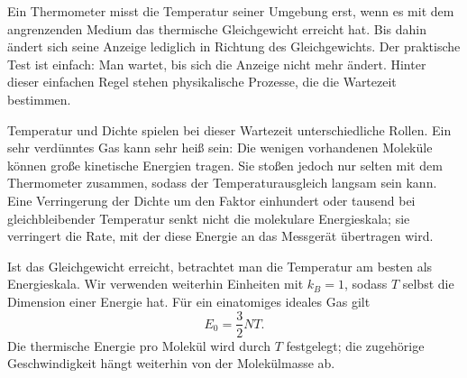 Ein Thermometer misst die Temperatur seiner Umgebung erst, wenn es mit dem angrenzenden Medium das thermische Gleichgewicht erreicht hat. Bis dahin ändert sich seine Anzeige lediglich in Richtung des Gleichgewichts. Der praktische Test ist einfach: Man wartet, bis sich die Anzeige nicht mehr ändert. Hinter dieser einfachen Regel stehen physikalische Prozesse, die die Wartezeit bestimmen.

\begin{classroomqa}
\end{classroomqa}

Temperatur und Dichte spielen bei dieser Wartezeit unterschiedliche Rollen. Ein sehr verdünntes Gas kann sehr heiß sein: Die wenigen vorhandenen Moleküle können große kinetische Energien tragen. Sie stoßen jedoch nur selten mit dem Thermometer zusammen, sodass der Temperaturausgleich langsam sein kann. Eine Verringerung der Dichte um den Faktor einhundert oder tausend bei gleichbleibender Temperatur senkt nicht die molekulare Energieskala; sie verringert die Rate, mit der diese Energie an das Messgerät übertragen wird.

\begin{classroomqa}
\end{classroomqa}

Ist das Gleichgewicht erreicht, betrachtet man die Temperatur am besten als Energieskala. Wir verwenden weiterhin Einheiten mit \(k_B=1\), sodass \(T\) selbst die Dimension einer Energie hat. Für ein einatomiges ideales Gas gilt
\begin{equation}
 E_0=\frac{3}{2}NT.
 \label{eq:sm6-ideal-energy}
\end{equation}
Die thermische Energie pro Molekül wird durch \(T\) festgelegt; die zugehörige Geschwindigkeit hängt weiterhin von der Molekülmasse ab.

